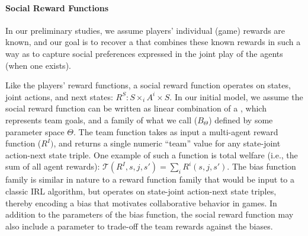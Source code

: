 
\vspace{\up}
\paragraph{Social Reward Functions}

In our preliminary studies, we assume players' individual (game)
rewards are known, and our goal is to recover a  that combines these known rewards in such a way as to
capture social preferences expressed in the joint play of the agents
(when one exists).

Like the players' reward functions, a social reward function operates
on states, joint actions, and next states: $R^S : S \times_i A^i
\times S$.  In our initial model, we assume the social reward function
can be written as linear combination of a , which
represents team goals,
and a family of what we call  ($B_\Theta$)
defined by some parameter space $\Theta$.  The team function takes as
input a multi-agent reward function ($R^I)$, and returns a single
numeric ``team'' value for any state-joint action-next state
triple. One example of such a function is total welfare (i.e., the sum
of all agent rewards): ${\mathcal T}(R^I, s, j, s') = \sum_i R^i(s, j, s')$.
%
The bias function family is similar in nature to a reward function
family that would be input to a classic IRL algorithm, but operates on
state-joint action-next state triples, thereby encoding a bias that
motivates collaborative behavior in games.  In addition to the
parameters of the bias function, the social reward function may also
include a parameter
to trade-off the team rewards against the biases.


